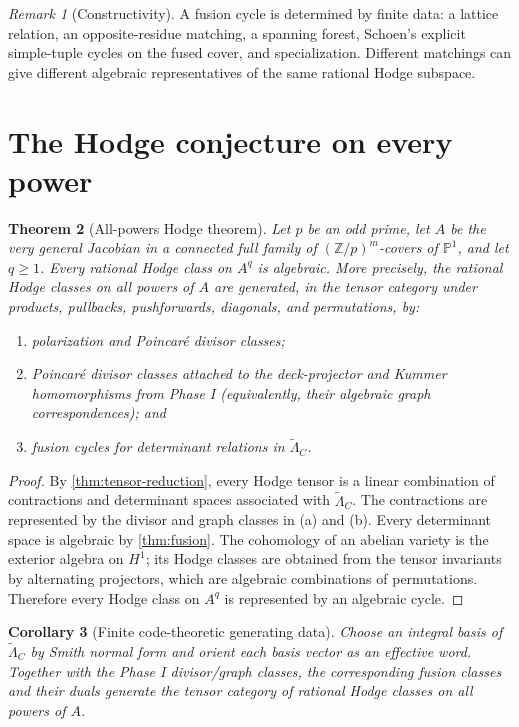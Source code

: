 \documentclass[11pt]{article}
\newtheorem{theorem}{Theorem}[section]
\newtheorem{corollary}[theorem]{Corollary}
\theoremstyle{definition}
\theoremstyle{remark}
\newtheorem{remark}[theorem]{Remark}
\newcommand{\Z}{\mathbb Z}
\newcommand{\PP}{\mathbb P}
\begin{document}
\begin{remark}[Constructivity]
A fusion cycle is determined by finite data: a lattice relation, an opposite-residue matching, a spanning forest, Schoen's explicit simple-tuple cycles on the fused cover, and specialization.  Different matchings can give different algebraic representatives of the same rational Hodge subspace.
\end{remark}

\section{The Hodge conjecture on every power}\label{sec:HC}

\begin{theorem}[All-powers Hodge theorem]\label{thm:all-powers}
Let $p$ be an odd prime, let $A$ be the very general Jacobian in a connected full family of $(\Z/p)^m$-covers of $\PP^1$, and let $q\ge1$.  Every rational Hodge class on $A^q$ is algebraic.  More precisely, the rational Hodge classes on all powers of $A$ are generated, in the tensor category under products, pullbacks, pushforwards, diagonals, and permutations, by:
\begin{enumerate}[label=\textup{(\alph*)}]
\item polarization and Poincar\'e divisor classes;
\item Poincar\'e divisor classes attached to the deck-projector and Kummer homomorphisms from Phase I (equivalently, their algebraic graph correspondences); and
\item fusion cycles for determinant relations in $\widetilde\Lambda_C$.
\end{enumerate}
\end{theorem}

\begin{proof}
By \cref{thm:tensor-reduction}, every Hodge tensor is a linear combination of contractions and determinant spaces associated with $\widetilde\Lambda_C$.  The contractions are represented by the divisor and graph classes in (a) and (b).  Every determinant space is algebraic by \cref{thm:fusion}.  The cohomology of an abelian variety is the exterior algebra on $H^1$; its Hodge classes are obtained from the tensor invariants by alternating projectors, which are algebraic combinations of permutations.  Therefore every Hodge class on $A^q$ is represented by an algebraic cycle.
\end{proof}

\begin{corollary}[Finite code-theoretic generating data]\label{cor:finite-generation}
Choose an integral basis of $\widetilde\Lambda_C$ by Smith normal form and orient each basis vector as an effective word.  Together with the Phase I divisor/graph classes, the corresponding fusion classes and their duals generate the tensor category of rational Hodge classes on all powers of $A$.
\end{corollary}
\end{document}
